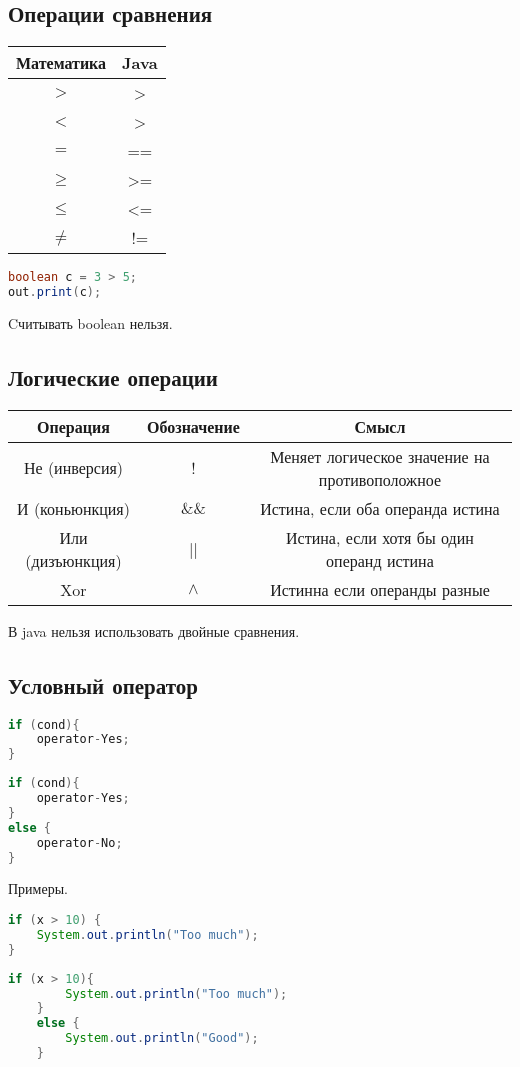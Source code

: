\documentclass{scrartcl}
\begin{document}
\subsection{Операции сравнения}
\begin{tabular}
	{c | c}
	Математика & Java \\
	\hline
	$>$        & >    \\
	$<$        & >    \\
	$=$        & ==   \\
	$\ge $     & >=   \\
	$\le $     & <=   \\
	$\neq$     & !=   \\
\end{tabular}
\begin{lstlisting}[language=Java] 
boolean c = 3 > 5;
out.print(c);
\end{lstlisting}
Cчитывать boolean нельзя.
\subsection{Логические операции}
\begin{tabular}
	{|c | c | c |}
	\hline
	Операция         & Обозначение & Смысл                                         \\
	\hline
	Не (инверсия)    & !           & Меняет логическое значение на противоположное \\
	\hline
	И (коньюнкция)   & $\&\&$      & Истина, если оба операнда истина              \\
	\hline
	Или (дизъюнкция) & ||          & Истина, если хотя бы один операнд истина      \\
	\hline
	Xor              & $\land$     & Истинна если операнды разные                  \\
	\hline
\end{tabular}
В java нельзя использовать двойные сравнения.
\subsection{Условный оператор}
\begin{lstlisting}[language=Java] 
if (cond){
    operator-Yes;
} 
\end{lstlisting}
\begin{lstlisting}[language=Java] 
if (cond){
    operator-Yes;
}
else {
    operator-No;
}
\end{lstlisting}
Примеры.
\begin{lstlisting}[language=Java] 
if (x > 10) {
    System.out.println("Too much");
} 
\end{lstlisting}
\begin{lstlisting}[language=Java] 
    if (x > 10){
        System.out.println("Too much");
    } 
    else {
        System.out.println("Good");
    }
\end{lstlisting}
\end{document}
